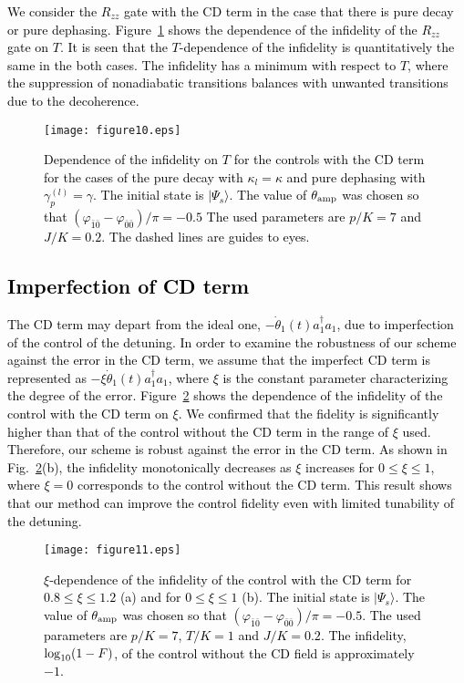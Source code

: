 \documentclass[%
 reprint,
 amsmath,amssymb,
 aps,
pra,
]{revtex4-2}
\begin{document}
\textcolor{black}{
We consider the $R_{zz}$ gate with the CD term in the case that there is pure decay or pure dephasing.
Figure~\ref{fid_fin_com_purekappa_6_25_22} shows the dependence of the infidelity of the $R_{zz}$ gate on $T$.
It is seen that the $T$-dependence of the infidelity is quantitatively the same in the both cases.
The infidelity has a minimum with respect to $T$, where the suppression of nonadiabatic transitions balances with unwanted transitions due to the decoherence.
}
\begin{figure}[h!]
\begin{center}
\texttt{[image: figure10.eps]}
\end{center}
\caption{
\textcolor{black}{Dependence of the infidelity on $T$ for the controls with the CD term 
for the cases of the pure decay with $\kappa_l=\kappa$ and pure dephasing with $\gamma_p^{(l)}=\gamma$.
The initial state is $|\Psi_s\rangle$.
The value of  $\theta_{\rm amp}$ was chosen so that  $(\varphi_{\bar{1}\bar{0}} - \varphi_{\bar{0}\bar{0}})/\pi=-0.5$
The used parameters are $p/K=7$ and $J/K=0.2$.
The dashed lines are guides to eyes.}
}
\label{fid_fin_com_purekappa_6_25_22}
\end{figure}

\textcolor{black}{
\subsection{Imperfection of CD term}
\label{Imperfection of CD term}}
\textcolor{black}{The CD term may depart from the ideal one, $-\dot{\theta}_1(t)a_1^\dagger a_1$, due to imperfection of the control of the detuning.
In order to examine the robustness of our scheme against the error in the CD term, we assume that the imperfect CD term is represented as $-\xi\dot{\theta}_1(t)a_1^\dagger a_1$, where $\xi$ is the constant parameter characterizing the degree of the error.}
\textcolor{black}{Figure~\ref{fid_error_5_22_22} shows the dependence of the infidelity of the control with the CD term on $\xi$. 
We confirmed that the fidelity is significantly higher than that of the control without the CD term in the range of $\xi$ used.
Therefore, our scheme is robust against the error in the CD term.}
\textcolor{black}{As shown in Fig.~\ref{fid_error_5_22_22}(b), the infidelity monotonically decreases as $\xi$ increases for $0\le \xi\le 1$, where $\xi=0$ corresponds to the control without the CD term.
This result shows that our method can improve the control fidelity even with limited tunability of the detuning.}
\begin{figure}[]
\begin{center}
\texttt{[image: figure11.eps]}
\end{center}
\caption{
\textcolor{black}{$\xi$-dependence of the infidelity of the control with the CD term \textcolor{black}{for $0.8\le \xi\le 1.2$ (a) and for $0\le \xi\le 1$ (b)}.
The initial state is $|\Psi_s\rangle$.
The value of  $\theta_{\rm amp}$ was chosen so that  $(\varphi_{\bar{1}\bar{0}} - \varphi_{\bar{0}\bar{0}})/\pi=-0.5$.
The used parameters are $p/K=7$, $T/K=1$ and $J/K=0.2$.
The infidelity, ${\rm log}_{10}(1-F)$, of the control without the CD field is approximately $-1$.
}
}
\label{fid_error_5_22_22}
\end{figure}
\end{document}
